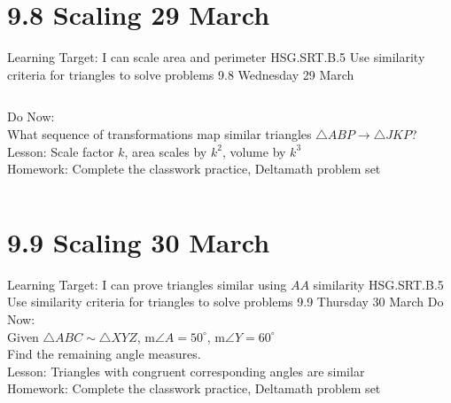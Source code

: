 \documentclass[onlytextwidth, aspectratio=169]{beamer}
\begin{document}
\section{9.8 Scaling \hfill 29 March \,}
\begin{frame}{Learning Target: I can scale area and perimeter}
  {HSG.SRT.B.5 Use similarity criteria for triangles to solve problems \hfill \alert{9.8 Wednesday 29 March}}
  \begin{columns}
    Do Now:\\
    What sequence of transformations map similar triangles $\triangle ABP \rightarrow \triangle JKP$? \\[0.5cm]
    Lesson: Scale factor $k$, area scales by $k^2$, volume by $k^3$ \\[0.5cm]
    Homework: Complete the classwork practice, Deltamath problem set \\[0.5cm]
    \begin{flushright}
    \end{flushright}
  \end{columns}
\end{frame}


\section{9.9 Scaling \hfill 30 March \,}
\begin{frame}{Learning Target: I can prove triangles similar using $AA$ similarity}
  {HSG.SRT.B.5 Use similarity criteria for triangles to solve problems \hfill \alert{9.9 Thursday 30 March}}
    Do Now:\\
    Given $\triangle ABC \sim \triangle XYZ$, m$\angle A = 50^\circ$, m$\angle Y = 60^\circ$ \\[0.25cm]
    Find the remaining angle measures. \\[0.5cm]
    Lesson: Triangles with congruent corresponding angles are similar \\[0.5cm]
    Homework: Complete the classwork practice, Deltamath problem set \\[0.5cm]
\end{frame}
\end{document}
